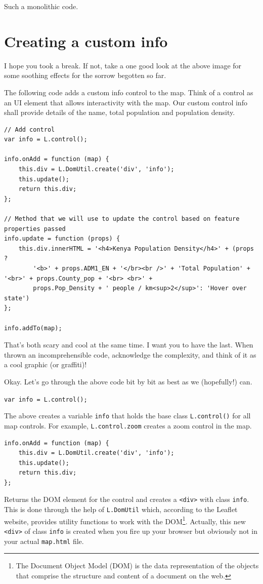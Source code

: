 \documentclass[
]{book}
\begin{document}
Such a monolithic code.

\hypertarget{creating-a-custom-info}{%
\section{Creating a custom info}\label{creating-a-custom-info}}

I hope you took a break. If not, take a one good look at the above image for some soothing effects for the sorrow begotten so far.

The following code adds a custom info control to the map. Think of a control as an UI element that allows interactivity with the map. Our custom control info shall provide details of the name, total population and population density.

\begin{verbatim}
// Add control
var info = L.control();

info.onAdd = function (map) {
    this.div = L.DomUtil.create('div', 'info');
    this.update();
    return this.div;
};

// Method that we will use to update the control based on feature properties passed
info.update = function (props) {
    this.div.innerHTML = '<h4>Kenya Population Density</h4>' + (props ? 
        '<b>' + props.ADM1_EN + '</br><br />' + 'Total Population' + '<br>' + props.County_pop + '<br> <br>' + 
        props.Pop_Density + ' people / km<sup>2</sup>': 'Hover over state')
};

info.addTo(map);
\end{verbatim}

That's both scary and cool at the same time. I want you to have the last. When thrown an incomprehensible code, acknowledge the complexity, and think of it as a cool graphic (or graffiti)!

Okay. Let's go through the above code bit by bit as best as we (hopefully!) can.

\texttt{var\ info\ =\ L.control();}

The above creates a variable \texttt{info} that holds the base class \texttt{L.control()} for all map controls. For example, \texttt{L.control.zoom} creates a zoom control in the map.

\begin{verbatim}
info.onAdd = function (map) {
    this.div = L.DomUtil.create('div', 'info');
    this.update();
    return this.div;
};
\end{verbatim}

Returns the DOM element for the control and creates a \texttt{\textless{}div\textgreater{}} with class \texttt{info}. This is done through the help of \texttt{L.DomUtil} which, according to the Leaflet website, provides utility functions to work with the DOM\footnote{The Document Object Model (DOM) is the data representation of the objects that comprise the structure and content of a document on the web.}. Actually, this new \texttt{\textless{}div\textgreater{}} of class \texttt{info} is created when you fire up your browser but obviously not in your actual \texttt{map.html} file.
\end{document}
